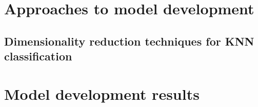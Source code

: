\section{Approaches to model development}
\label{sec:approaches-to-model-development}
\subsection{Dimensionality reduction techniques for KNN classification}
\label{subsec:dimensionality-reduction-techniques-for-knn-classification}

\section{Model development results}
\label{sec:model-development-results}